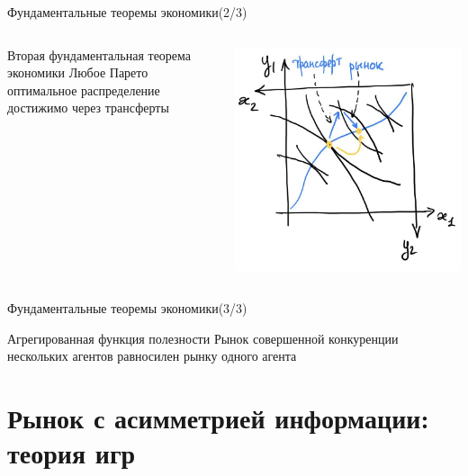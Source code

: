 \documentclass{beamer}
\begin{document}
\begin{frame}{Фундаментальные теоремы экономики(2/3)}

\begin{columns}
\begin{block}{Вторая фундаментальная теорема экономики}
    Любое Парето оптимальное распределение достижимо через трансферты
\end{block}


        \includegraphics[width=1.0\textwidth]{2_figs/edgeworth_trans.jpg}


\end{columns}


\end{frame}


\begin{frame}{Фундаментальные теоремы экономики(3/3)}

\begin{block}{Агрегированная функция полезности}
    Рынок совершенной конкуренции нескольких агентов равносилен рынку одного агента
\end{block}

\end{frame}



\section{Рынок с асимметрией информации: теория игр}
\end{document}
